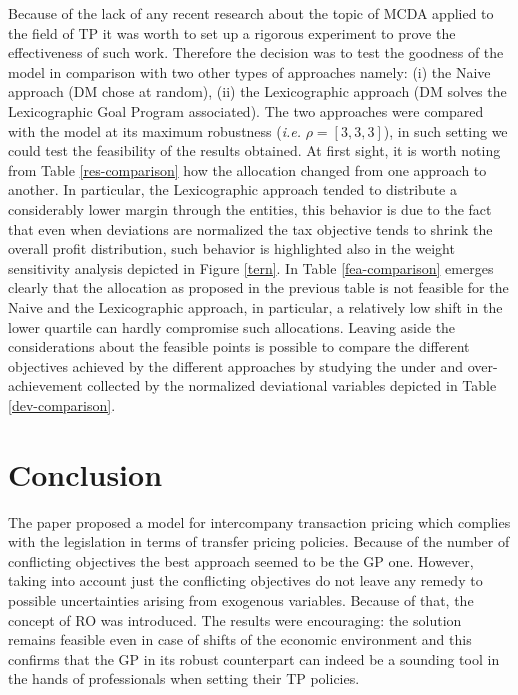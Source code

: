 \documentclass[conference,final,a4paper]{IEEEtran}
\begin{document}
Because of the lack of any recent research\cite{merville1978} about the topic of MCDA applied to the field of TP it was worth to set up a rigorous experiment to prove the effectiveness of such work. Therefore the decision was to test the goodness of the model in comparison with two other types of approaches namely: (i) the Naive approach (DM chose at random), (ii) the Lexicographic approach (DM solves the Lexicographic Goal Program associated). The two approaches were compared with the model at its maximum robustness (\emph{i.e.} $\rho=[3,3,3]$), in such setting we could test the feasibility of the results obtained. At first sight, it is worth noting from Table \ref{res-comparison} how the allocation changed from one approach to another. In particular, the Lexicographic approach tended to distribute a considerably lower margin through the entities, this behavior is due to the fact that even when deviations are normalized the tax objective tends to shrink the overall profit distribution, such behavior is highlighted also in the weight sensitivity analysis depicted in Figure \ref{tern}. In Table \ref{fea-comparison} emerges clearly that the allocation as proposed in the previous table is not feasible for the Naive and the Lexicographic approach, in particular, a relatively low shift in the lower quartile can hardly compromise such allocations. Leaving aside the considerations about the feasible points is possible to compare the different objectives achieved by the different approaches by studying the under and over-achievement collected by the normalized deviational variables depicted in Table \ref{dev-comparison}.

\hypertarget{conclusion}{%
\section{Conclusion}\label{conclusion}}
The paper proposed a model for intercompany transaction pricing which complies with the legislation in terms of transfer pricing policies. Because of the number of conflicting objectives the best approach seemed to be the GP one. However, taking into account just the conflicting objectives do not leave any remedy to possible uncertainties arising from exogenous variables. Because of that, the concept of RO was introduced. The results were encouraging: the solution remains feasible even in case of shifts of the economic environment and this confirms that the GP in its robust counterpart can indeed be a sounding tool in the hands of professionals when setting their TP policies.



\end{document}
